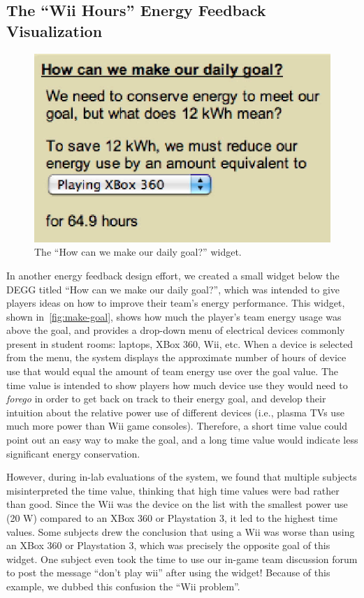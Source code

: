 \documentclass[10pt, conference, compsocconf]{IEEEtran-old}
\begin{document}
\subsection{The ``Wii Hours'' Energy Feedback Visualization}

\begin{figure}[!tb]
	\centering
	\includegraphics[width=0.9\columnwidth]{how-meet-goal.eps}
	\caption{The ``How can we make our daily goal?'' widget.}
	\label{fig:make-goal}
\end{figure}

In another energy feedback design effort, we created a small widget below the DEGG titled ``How can we make our daily goal?'', which was intended to give players ideas on how to improve their team's energy performance. This widget, shown in~\autoref{fig:make-goal}, shows how much the player's team energy usage was above the goal, and provides a drop-down menu of electrical devices commonly present in student rooms: laptops, XBox 360, Wii, etc. When a device is selected from the menu, the system displays the approximate number of hours of device use that would equal the amount of team energy use over the goal value. The time value is intended to show players how much device use they would need to \emph{forego} in order to get back on track to their energy goal, and develop their intuition about the relative power use of different devices (i.e., plasma TVs use much more power than Wii game consoles). Therefore, a short time value could point out an easy way to make the goal, and a long time value would indicate less significant energy conservation.

However, during in-lab evaluations of the system, we found that multiple subjects misinterpreted the time value, thinking that high time values were bad rather than good. Since the Wii was the device on the list with the smallest power use (20 W) compared to an XBox 360 or Playstation 3, it led to the highest time values. Some subjects drew the conclusion that using a Wii was worse than using an XBox 360 or Playstation 3, which was precisely the opposite goal of this widget. One subject even took the time to use our in-game team discussion forum to post the message ``don't play wii'' after using the widget! Because of this example, we dubbed this confusion the ``Wii problem''.
\end{document}
